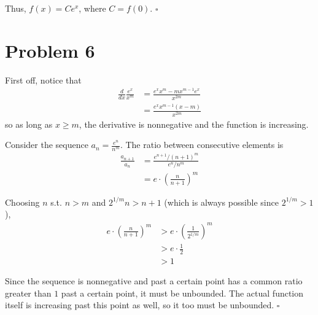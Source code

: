 \documentclass[12pt]{article}
\begin{document}
Thus, $f(x)=Ce^x$, where $C=f(0)$. $\square$

\pagebreak

\section{Problem 6}

First off, notice that
\begin{align*}
    \frac{d}{dx} \frac{e^x}{x^m}
    &= \frac{e^x x^m - mx^{m-1}e^x}{x^{2m}} \\
    &= \frac{e^x x^{m-1}\left(x - m\right)}{x^{2m}}
\end{align*}
so as long as $x \ge m$, the derivative is nonnegative and the function is increasing.

Consider the sequence $a_n=\frac{e^n}{n^m}$.
The ratio between consecutive elements is
\begin{align*}
    \frac{a_{n+1}}{a_n}
     & = \frac{e^{n+1} / (n+1)^m}{e^n / n^m}  \\
     & = e \cdot \left(\frac{n}{n+1}\right)^m
\end{align*}

Choosing $n$ s.t. $n > m$ and $2^{1/m}n > n+1$
(which is always possible since $2^{1/m} > 1$),
\begin{align*}
    e \cdot \left(\frac{n}{n+1}\right)^m
    &> e \cdot \left(\frac{1}{2^{1/m}}\right)^m \\
    &> e \cdot \frac{1}{2} \\
    &> 1
\end{align*}

Since the sequence is nonnegative and past a certain point
has a common ratio greater than $1$ past a certain point, it must be unbounded.
The actual function itself is increasing past this point as well,
so it too must be unbounded. $\square$
\end{document}
